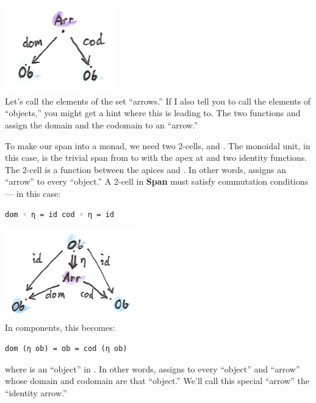 \includegraphics[width=1.91667in]{images/spanmonad.png}\\
Let's call the elements of the set  ``arrows.'' If I also
tell you to call the elements of  ``objects,'' you might get
a hint where this is leading to. The two functions  and
 assign the domain and the codomain to an ``arrow.''

To make our span into a monad, we need two 2-cells,  and
. The monoidal unit, in this case, is the trivial span from
 to  with the apex at  and two identity
functions. The 2-cell  is a function between the apices
 and . In other words,  assigns an
``arrow'' to every ``object.'' A 2-cell in \textbf{Span} must satisfy
commutation conditions --- in this case:

\begin{Verbatim}[commandchars=\\\{\}]
dom ◦ η = id cod ◦ η = id
\end{Verbatim}

\includegraphics[width=2.27083in]{images/spanunit.png}\\
In components, this becomes:

\begin{Verbatim}[commandchars=\\\{\}]
dom (η ob) = ob = cod (η ob)
\end{Verbatim}

where  is an ``object'' in . In other words,
 assigns to every ``object'' and ``arrow'' whose domain and
codomain are that ``object.'' We'll call this special ``arrow'' the
``identity arrow.''

